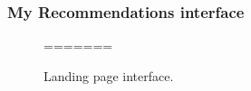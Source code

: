 \subsubsection{My Recommendations interface}

\begin{figure}
\captionsetup{font=footnotesize}
\centering
{}
=======
\caption{Landing page interface.}
\label{fig:landing}   
\end{figure}
